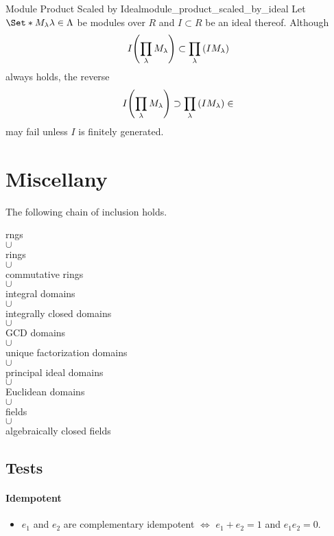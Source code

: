 \documentclass{article}
\begin{document}
\begin{counterexample}{Module Product Scaled by Ideal}{module_product_scaled_by_ideal}
    Let $\Set*{M_\lambda}{\lambda\in\Lambda}$ be modules over $R$ and $I\subset R$ be an ideal thereof.
    Although
    \[ I\qty(\prod_\lambda M_\lambda) \subset \prod_\lambda \qty(I M_\lambda) \]
    always holds, the reverse
    \[ I\qty(\prod_\lambda M_\lambda) \supset \prod_\lambda \qty(I M_\lambda) \in \]
    may fail unless $I$ is finitely generated.
\end{counterexample}

\section*{Miscellany}

The following chain of inclusion holds.
\begin{center}
    rngs \\
    $\cup$ \\
    rings \\
    $\cup$  \\
    commutative rings  \\
    $\cup$  \\
    integral domains \\
    $\cup$  \\
    integrally closed domains \\
    $\cup$  \\
    GCD domains \\
    $\cup$  \\
    unique factorization domains \\
    $\cup$  \\
    principal ideal domains \\
    $\cup$  \\
    Euclidean domains \\
    $\cup$  \\
    fields \\
    $\cup$  \\
    algebraically closed fields \\
\end{center}

\subsection*{Tests}

\paragraph*{Idempotent}
\begin{itemize}
    \item $e_1$ and $e_2$ are complementary idempotent $\Leftrightarrow$ $e_1+e_2=1$ and $e_1 e_2 = 0$.
\end{itemize}
\end{document}
